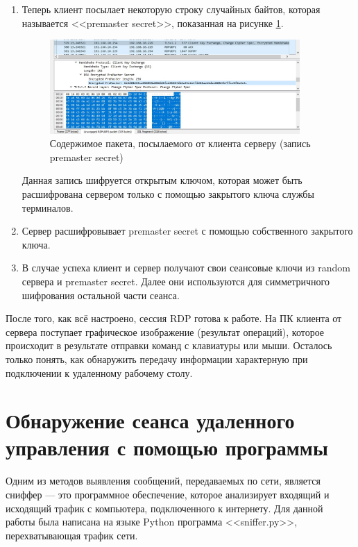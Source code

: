 \documentclass[bachelor, och, coursework]{SCWorks}
\begin{document}
\begin{enumerate}
    \item Теперь клиент посылает некоторую строку случайных байтов, которая называется <<premaster secret>>, показанная на рисунке \ref{cert1}. 
    
    \begin{figure}[H]
      \centering
      \includegraphics[width=0.9\textwidth]{photo/cert1.png}
      \caption{Содержимое пакета, посылаемого от клиента серверу (запись premaster secret)}
      \label{cert1}
    \end{figure}
    
    Данная запись шифруется открытым ключом, которая может быть расшифрована сервером только с помощью закрытого ключа службы терминалов.
    \item Сервер расшифровывает premaster secret с помощью собственного закрытого ключа.
    \item В случае успеха клиент и сервер получают свои сеансовые ключи из random сервера и premaster secret. Далее они используются для симметричного 
    шифрования остальной части сеанса.
  \end{enumerate}
  
  После того, как всё настроено, сессия RDP готова к работе. На ПК клиента от сервера поступает графическое изображение
  (результат операций), которое происходит в результате отправки команд с клавиатуры или мыши. Осталось только понять, как обнаружить передачу информации
  характерную при подключении к удаленному рабочему столу.

  \section{Обнаружение сеанса удаленного управления с помощью программы}
  
  Одним из методов выявления сообщений, передаваемых по сети, является сниффер --- это программное обеспечение, которое анализирует входящий
  и исходящий трафик с компьютера, подключенного к интернету. Для данной работы была написана на языке Python программа <<sniffer.py>>, перехватывающая
  трафик сети.
    
\end{document}
